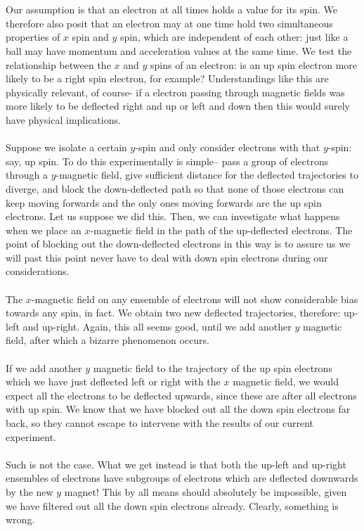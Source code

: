 \\\\
Our assumption is that an electron at all times holds a value for its spin. We therefore also posit that an electron may at one time hold two simultaneous properties of $x$ spin and $y$ spin, which are independent of each other: just like a ball may have momentum and acceleration values at the same time. We test the relationship between the $x$ and $y$ spins of an electron: is an up spin electron more likely to be a right spin electron, for example? Understandings like this are physically relevant, of course- if a electron passing through  magnetic fields was more likely to be deflected right and up or left and down then this would surely have physical implications. 
\\\\
Suppose we isolate a certain $y$-spin and only consider electrons with that $y$-spin: say, up spin. To do this experimentally is simple-- pass a group of electrons through a $y$-magnetic field, give sufficient distance for the deflected trajectories to diverge, and block the down-deflected path so that none of those electrons can keep moving forwards and the only ones moving forwards are the up spin electrons. Let us suppose we did this. Then, we can investigate what happens when we place an $x$-magnetic field in the path of the up-deflected electrons. The point of blocking out the down-deflected electrons in this way is to assure us we will past this point never have to deal with down spin electrons during our considerations.
\\\\
The $x$-magnetic field on any ensemble of electrons will not show considerable bias towards any spin, in fact. We obtain two new deflected trajectories, therefore: up-left and up-right. Again, this all seems good, until we add another $y$ magnetic field, after which a bizarre phenomenon occurs.
\\\\
If we add another $y$ magnetic field to the trajectory of the up spin electrons which we have just deflected left or right with the $x$ magnetic field, we would expect all the electrons to be deflected upwards, since these are after all electrons with up spin. We know that we have blocked out all the down spin electrons far back, so they cannot escape to intervene with the results of our current experiment.
\\\\
Such is not the case. What we get instead is that both the up-left and up-right ensembles of electrons have subgroups of electrons which are deflected downwards by the new $y$ magnet! This by all means should absolutely be impossible, given we have filtered out all the down spin electrons already. Clearly, something is wrong. 
